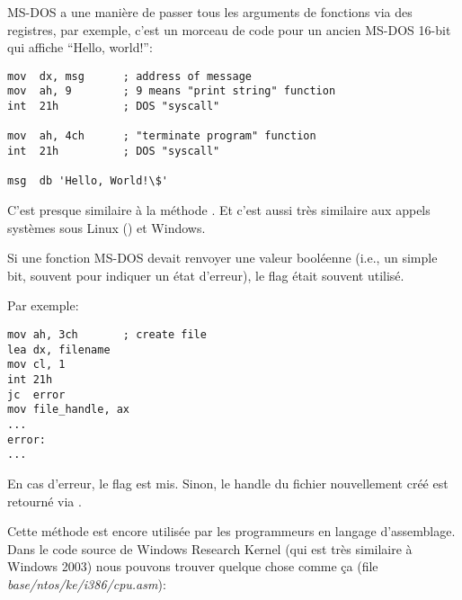 MS-DOS a une manière de passer tous les arguments de fonctions via des registres,
par exemple, c'est un morceau de code pour un ancien MS-DOS 16-bit qui affiche
``Hello, world!'':

\begin{lstlisting}[style=customasmx86]
mov  dx, msg      ; address of message
mov  ah, 9        ; 9 means "print string" function
int  21h          ; DOS "syscall"

mov  ah, 4ch      ; "terminate program" function
int  21h          ; DOS "syscall"

msg  db 'Hello, World!\$'
\end{lstlisting}

C'est presque similaire à la méthode .
Et c'est aussi très similaire aux appels systèmes sous Linux () et Windows.

Si une fonction MS-DOS devait renvoyer une valeur booléenne (i.e., un simple bit,
souvent pour indiquer un état d'erreur), le flag  était souvent utilisé.

Par exemple:

\begin{lstlisting}[style=customasmx86]
mov ah, 3ch       ; create file
lea dx, filename
mov cl, 1
int 21h
jc  error
mov file_handle, ax
...
error:
...
\end{lstlisting}

En cas d'erreur, le flag  est mis. Sinon, le handle du fichier nouvellement
créé est retourné via .

Cette méthode est encore utilisée par les programmeurs en langage d'assemblage.
Dans le code source de Windows Research Kernel (qui est très similaire à Windows
2003) nous pouvons trouver quelque chose comme ça (file \emph{base/ntos/ke/i386/cpu.asm}):

